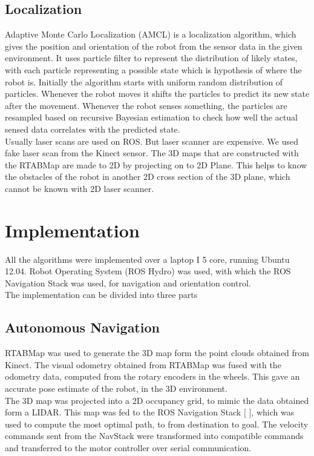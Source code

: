 \documentclass[conference]{IEEEtran}
\begin{document}
\subsection{Localization}
Adaptive Monte Carlo Localization (AMCL) is a localization algorithm, which gives the position and orientation of the robot from the sensor data in the given environment. It uses particle filter to represent the distribution of likely states, with each particle representing a possible state which is hypothesis of where the robot is. Initially the algorithm starts with uniform random distribution of particles. Whenever the robot moves it shifts the particles to predict its new state after the movement. Whenever the robot senses something, the particles are resampled based on recursive Bayesian estimation to check how well the actual sensed data correlates with the predicted state.\\
Usually laser scans are used on ROS. But laser scanner are expensive. We used fake laser scan from the Kinect sensor. The 3D maps that are constructed with the RTABMap are made to 2D by projecting on to 2D Plane. This helps to know the obstacles of the robot in another 2D cross section of the 3D plane, which cannot be known with 2D laser scanner.
\section{Implementation}
All the algorithms were implemented over a laptop I 5 core, running Ubuntu 12.04. Robot Operating System (ROS Hydro) was used, with which the ROS Navigation Stack was used, for navigation and orientation control.
\\
The implementation can be divided into three parts

\subsection{Autonomous Navigation}
RTABMap was used to generate the 3D map form the point clouds obtained from Kinect. The visual odometry obtained from RTABMap was fused with the odometry data, computed from the rotary encoders in the wheels. This gave an accurate pose estimate of the robot, in the 3D environment.
\\
The 3D map was projected into a 2D occupancy grid, to mimic the data obtained form a LIDAR. This map was fed to the ROS Navigation Stack [ ], which was used to compute the most optimal path, to from destination to goal. The velocity commands sent from the NavStack were transformed into compatible commands and transferred to the motor controller over serial communication.
\end{document}
